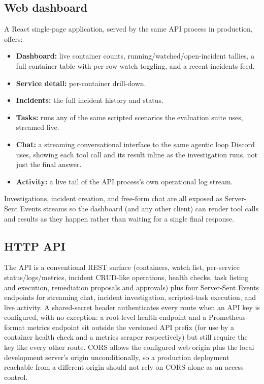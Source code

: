 \documentclass[11pt]{article}
\begin{document}
\subsection{Web dashboard}

A React single-page application, served by the same API process in
production, offers:

\begin{itemize}
  \item \textbf{Dashboard:} live container counts, running/watched/open-incident
    tallies, a full container table with per-row watch toggling, and a
    recent-incidents feed.
  \item \textbf{Service detail:} per-container drill-down.
  \item \textbf{Incidents:} the full incident history and status.
  \item \textbf{Tasks:} runs any of the same scripted scenarios the
    evaluation suite uses, streamed live.
  \item \textbf{Chat:} a streaming conversational interface to the same
    agentic loop Discord uses, showing each tool call and its result inline
    as the investigation runs, not just the final answer.
  \item \textbf{Activity:} a live tail of the API process's own operational
    log stream.
\end{itemize}

Investigations, incident creation, and free-form chat are all exposed as
Server-Sent Events streams so the dashboard (and any other client) can
render tool calls and results as they happen rather than waiting for a
single final response.

\subsection{HTTP API}

The API is a conventional REST surface (containers, watch list, per-service
status/logs/metrics, incident CRUD-like operations, health checks, task
listing and execution, remediation proposals and approvals) plus four
Server-Sent Events endpoints for streaming chat, incident investigation,
scripted-task execution, and live activity. A shared-secret header
authenticates every route when an API key is configured, with no exception:
a root-level health endpoint and a Prometheus-format metrics endpoint sit
outside the versioned API prefix (for use by a container health check and a
metrics scraper respectively) but still require the key like every other
route. CORS allows the configured web origin plus the local development
server's origin unconditionally, so a production deployment reachable from
a different origin should not rely on CORS alone as an access control.
\end{document}
